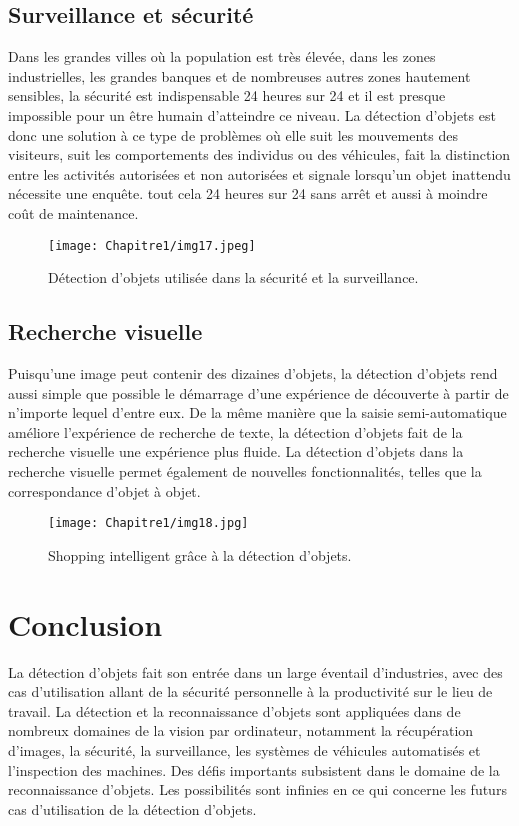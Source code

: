      
     \subsection{Surveillance et sécurité}
     Dans les grandes villes où la population est très élevée, dans les zones industrielles, les grandes banques et de nombreuses autres zones hautement sensibles, la sécurité est indispensable 24 heures sur 24 et il est presque impossible pour un être humain d'atteindre ce niveau. La détection d'objets est donc une solution à ce type de problèmes où elle suit les mouvements des visiteurs, suit les comportements des individus ou des véhicules, fait la distinction entre les activités autorisées et non autorisées et signale lorsqu'un objet inattendu nécessite une enquête. tout cela 24 heures sur 24 sans arrêt et aussi à moindre coût de maintenance.
     \begin{figure}[H]
          \centering
          \texttt{[image: Chapitre1/img17.jpeg]}
          \caption{Détection d'objets utilisée dans la sécurité et la surveillance.}
          \label{im17}
          \end{figure}

     \subsection{Recherche visuelle}   
     Puisqu'une image peut contenir des dizaines d'objets, la détection d'objets rend aussi simple que possible le démarrage d'une expérience de découverte à partir de n'importe lequel d'entre eux. De la même manière que la saisie semi-automatique améliore l'expérience de recherche de texte, la détection d'objets fait de la recherche visuelle une expérience plus fluide. La détection d'objets dans la recherche visuelle permet également de nouvelles fonctionnalités, telles que la correspondance d'objet à objet.
     \begin{figure}[H]
          \centering
          \texttt{[image: Chapitre1/img18.jpg]}
          \caption{Shopping intelligent grâce à la détection d'objets.}
          \label{im18}
          \end{figure}

\section{Conclusion}
La détection d'objets fait son entrée dans un large éventail d'industries, avec des cas d'utilisation allant de la sécurité personnelle à la productivité sur le lieu de travail. La détection et la reconnaissance d'objets sont appliquées dans de nombreux domaines de la vision par ordinateur, notamment la récupération d'images, la sécurité, la surveillance, les systèmes de véhicules automatisés et l'inspection des machines. Des défis importants subsistent dans le domaine de la reconnaissance d'objets. Les possibilités sont infinies en ce qui concerne les futurs cas d'utilisation de la détection d'objets.

